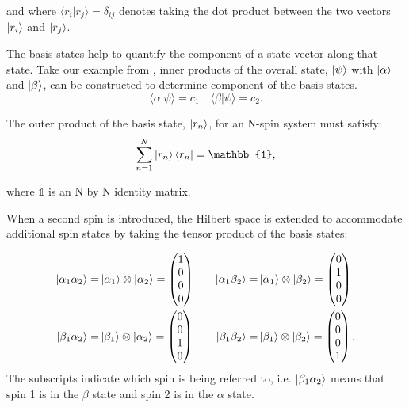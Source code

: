 and where $\langle r_i\vert r_j\rangle = \delta_{ij}$ denotes taking the dot product between the two
vectors $\ket{r_i}$ and $\ket{r_j}$.

The basis states help to quantify the component of a state vector along that state. Take our example
from , inner products of the overall state, $\ket{\psi}$ with $\ket{\alpha}$
and $\ket{\beta}$, can be constructed to determine component of the basis states.
\begin{equation}
  \langle\alpha\vert\psi\rangle = c_1 \quad \langle\beta\vert\psi\rangle = c_2.
\end{equation}

The outer product of the basis state, $\ket{r_n}$, for an N-spin system must satisfy:
\begin{equation}
  \sum_{n=1}^{N} \ket{r_n}\bra{r_n} = \mathbb{1},
\end{equation}

where $\mathbb{1}$ is an N by N identity matrix.

When a second spin is introduced, the Hilbert space is extended to accommodate additional spin
states by taking the tensor product of the basis states:

\begin{align}\label{eqn:2spinstates}
\ket{\alpha_{1}\alpha_{2}} =& \ket{\alpha_1} \otimes \ket{\alpha_2} = \begin{pmatrix}
  1\\
  0\\
  0\\
  0
\end{pmatrix} &\quad
\ket{\alpha_{1}\beta_{2}} =& \ket{\alpha_1} \otimes \ket{\beta_2} = \begin{pmatrix}
  0\\
  1\\
  0\\
  0
\end{pmatrix}\\
\ket{\beta_{1}\alpha_{2}} =& \ket{\beta_1} \otimes \ket{\alpha_2} = \begin{pmatrix}
  0\\
  0\\
  1\\
  0
\end{pmatrix} &\quad
\ket{\beta_{1}\beta_{2}} =& \ket{\beta_1} \otimes \ket{\beta_2} = \begin{pmatrix}
  0\\
  0\\
  0\\
  1
\end{pmatrix}.
\end{align}
The subscripts indicate which spin is being referred to, i.e. $\ket{\beta_1\alpha_2}$ means that
spin 1 is in the $\beta$ state and spin 2 is in the $\alpha$ state.

